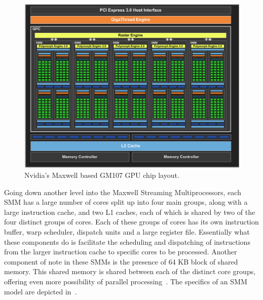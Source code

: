 \documentclass[a4paper,11pt]{article}
\begin{document}
\begin{figure}[ht]
  \centering
  \includegraphics[scale=0.3]{img/maxwell-chip}
  \caption{Nvidia's Maxwell based GM107 GPU chip layout.~\cite{whitepaper:NvidiaMaxwell}}
\label{fig:maxwell-gm107}
\end{figure}

Going down another level into the Maxwell Streaming Multiprocessors, each SMM has a large number of cores split up into
four main groups, along with a large instruction cache, and two L1 caches, each of which is shared by two of the four
distinct groups of cores. Each of these groups of cores has its own instruction buffer, warp scheduler, dispatch units and a large
register file. Essentially what these components do is facilitate the scheduling and dispatching of instructions from the
larger instruction cache to specific cores to be processed. Another component of note in these SMMs is the presence of
64 KB block of shared memory. This shared memory is shared between each of the distinct core groups, offering even more
possibility of parallel processing~\cite{whitepaper:NvidiaMaxwell}. The specifics of an SMM model are depicted in~.
\end{document}
